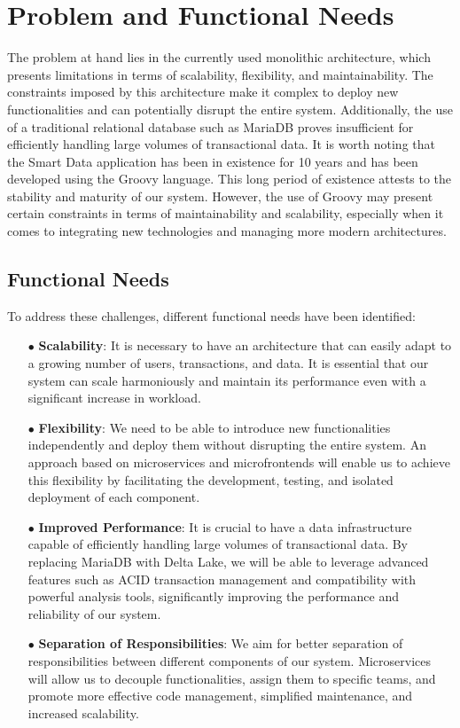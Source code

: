 \section{Problem and Functional Needs}

The problem at hand lies in the currently used monolithic architecture, which presents limitations in terms of scalability, flexibility, and maintainability. The constraints imposed by this architecture make it complex to deploy new functionalities and can potentially disrupt the entire system. Additionally, the use of a traditional relational database such as MariaDB proves insufficient for efficiently handling large volumes of transactional data. It is worth noting that the Smart Data application has been in existence for 10 years and has been developed using the Groovy language. This long period of existence attests to the stability and maturity of our system. However, the use of Groovy may present certain constraints in terms of maintainability and scalability, especially when it comes to integrating new technologies and managing more modern architectures.

\subsection*{Functional Needs}

To address these challenges, different functional needs have been identified:

\begin{enumerate}
\item[$\bullet$] \textbf{Scalability}: It is necessary to have an architecture that can easily adapt to a growing number of users, transactions, and data. It is essential that our system can scale harmoniously and maintain its performance even with a significant increase in workload.
\item[$\bullet$] \textbf{Flexibility}: We need to be able to introduce new functionalities independently and deploy them without disrupting the entire system. An approach based on microservices and microfrontends will enable us to achieve this flexibility by facilitating the development, testing, and isolated deployment of each component.
\item[$\bullet$] \textbf{Improved Performance}: It is crucial to have a data infrastructure capable of efficiently handling large volumes of transactional data. By replacing MariaDB with Delta Lake, we will be able to leverage advanced features such as ACID transaction management and compatibility with powerful analysis tools, significantly improving the performance and reliability of our system.
\item[$\bullet$] \textbf{Separation of Responsibilities}: We aim for better separation of responsibilities between different components of our system. Microservices will allow us to decouple functionalities, assign them to specific teams, and promote more effective code management, simplified maintenance, and increased scalability.
\end{enumerate}

